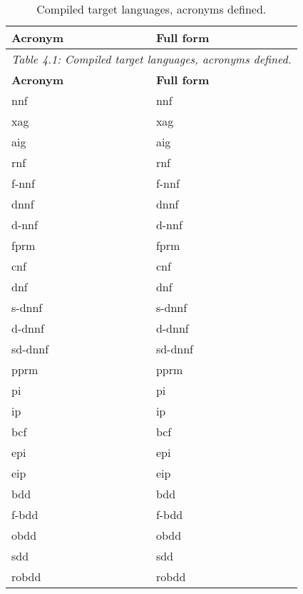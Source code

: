 \begin{longtable}[ht!]{ll}
\caption{Compiled target languages, acronyms defined.} \\
\toprule
\textbf{Acronym} & \textbf{Full form} \\
\midrule
\endfirsthead
\multicolumn{2}{c}{\textit{Table 4.1: Compiled target languages, acronyms defined.}} \\
\toprule
\textbf{Acronym} & \textbf{Full form} \\
\midrule
\endhead

\endfoot
\bottomrule
\endlastfoot

\acrshort{nnf}    & \acrlong{nnf}    \\
\acrshort{xag}    & \acrlong{xag}    \\
\acrshort{aig}    & \acrlong{aig}    \\
\acrshort{rnf}    & \acrlong{rnf}    \\
\acrshort{f-nnf}  & \acrlong{f-nnf}  \\
\acrshort{dnnf}   & \acrlong{dnnf}   \\
\acrshort{d-nnf}  & \acrlong{d-nnf}  \\
\acrshort{fprm}   & \acrlong{fprm}   \\
\acrshort{cnf}    & \acrlong{cnf}    \\
\acrshort{dnf}    & \acrlong{dnf}    \\
\acrshort{s-dnnf} & \acrlong{s-dnnf} \\
\acrshort{d-dnnf} & \acrlong{d-dnnf} \\
\acrshort{sd-dnnf} & \acrlong{sd-dnnf} \\
\acrshort{pprm}   & \acrlong{pprm}   \\
\acrshort{pi}     & \acrlong{pi}     \\
\acrshort{ip}     & \acrlong{ip}     \\
\acrshort{bcf}     & \acrlong{bcf}     \\
\acrshort{epi}    & \acrlong{epi}    \\
\acrshort{eip}    & \acrlong{eip}    \\
\acrshort{bdd}    & \acrlong{bdd}    \\
\acrshort{f-bdd}  & \acrlong{f-bdd}  \\
\acrshort{obdd}   & \acrlong{obdd}   \\
\acrshort{sdd}    & \acrlong{sdd}    \\
\acrshort{robdd}  & \acrlong{robdd}  \\
\end{longtable}